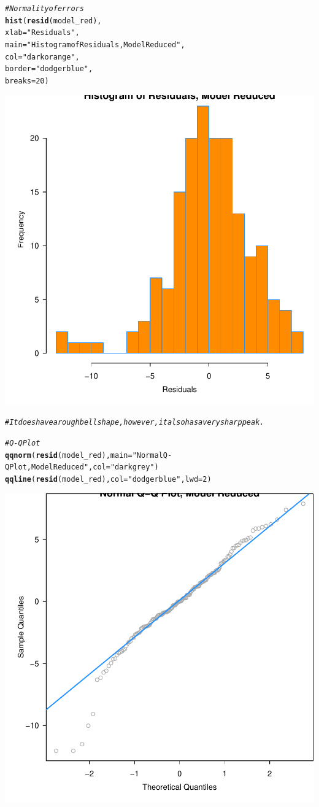 \documentclass{article}\usepackage[]{graphicx}\usepackage[]{color}
\makeatletter
\newcommand{\hlnum}[1]{\textcolor[rgb]{0.686,0.059,0.569}{#1}}%
\newcommand{\hlstr}[1]{\textcolor[rgb]{0.192,0.494,0.8}{#1}}%
\newcommand{\hlcom}[1]{\textcolor[rgb]{0.678,0.584,0.686}{\textit{#1}}}%
\newcommand{\hlstd}[1]{\textcolor[rgb]{0.345,0.345,0.345}{#1}}%
\newcommand{\hlkwc}[1]{\textcolor[rgb]{0.333,0.667,0.333}{#1}}%
\newcommand{\hlkwd}[1]{\textcolor[rgb]{0.737,0.353,0.396}{\textbf{#1}}}%
\newenvironment{kframe}{%
 \def\at@end@of@kframe{}%
 \ifinner\ifhmode%
  \def\at@end@of@kframe{\end{minipage}}%
  \begin{minipage}{\columnwidth}%
 \fi\fi%
 \def\FrameCommand##1{\hskip\@totalleftmargin \hskip-\fboxsep
 \colorbox{shadecolor}{##1}\hskip-\fboxsep
     \hskip-\linewidth \hskip-\@totalleftmargin \hskip\columnwidth}%
 \MakeFramed {\advance\hsize-\width
   \@totalleftmargin\z@ \linewidth\hsize
   \@setminipage}}%
 {\par\unskip\endMakeFramed%
 \at@end@of@kframe}
\newenvironment{knitrout}{}{} %
\makeatother
\begin{document}
\begin{knitrout}
\begin{kframe}
\begin{alltt}
\hlcom{# Normality of errors}
\hlkwd{hist}\hlstd{(}\hlkwd{resid}\hlstd{(model_red),}
     \hlkwc{xlab}   \hlstd{=} \hlstr{"Residuals"}\hlstd{,}
     \hlkwc{main}   \hlstd{=} \hlstr{"Histogram of Residuals, Model Reduced"}\hlstd{,}
     \hlkwc{col}    \hlstd{=} \hlstr{"darkorange"}\hlstd{,}
     \hlkwc{border} \hlstd{=} \hlstr{"dodgerblue"}\hlstd{,}
     \hlkwc{breaks} \hlstd{=} \hlnum{20}\hlstd{)}
\end{alltt}
\end{kframe}

{\centering \includegraphics[width=.6\linewidth]{figure/Analysis-Rnwauto-report-26} 

}


\begin{kframe}\begin{alltt}
\hlcom{# It does have a rough bell shape, however, it also has a very sharp peak.}

\hlcom{# Q-Q Plot}
\hlkwd{qqnorm}\hlstd{(}\hlkwd{resid}\hlstd{(model_red),} \hlkwc{main} \hlstd{=} \hlstr{"Normal Q-Q Plot, Model Reduced"}\hlstd{,} \hlkwc{col} \hlstd{=} \hlstr{"darkgrey"}\hlstd{)}
\hlkwd{qqline}\hlstd{(}\hlkwd{resid}\hlstd{(model_red),} \hlkwc{col} \hlstd{=} \hlstr{"dodgerblue"}\hlstd{,} \hlkwc{lwd} \hlstd{=} \hlnum{2}\hlstd{)}
\end{alltt}
\end{kframe}

{\centering \includegraphics[width=.6\linewidth]{figure/Analysis-Rnwauto-report-27} 

}
\end{knitrout}
\end{document}
